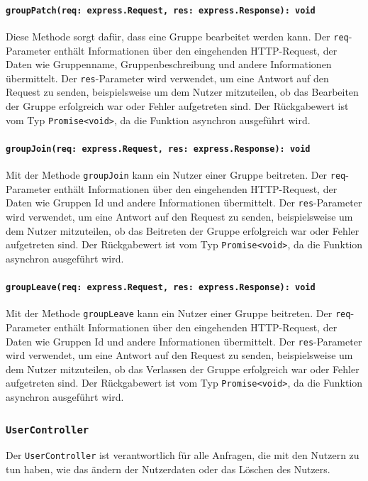 \documentclass{entwurfsheft}
\begin{document}
\paragraph{\texttt{groupPatch(req: express.Request, res: express.Response): void}}
Diese Methode sorgt dafür, dass eine Gruppe bearbeitet werden kann. Der \texttt{req}-Parameter enthält Informationen über den eingehenden HTTP-Request, der Daten wie Gruppenname, Gruppenbeschreibung und andere Informationen übermittelt. Der \texttt{res}-Parameter wird verwendet, um eine Antwort auf den Request zu senden, beispielsweise um dem Nutzer mitzuteilen, ob das Bearbeiten der Gruppe erfolgreich war oder Fehler aufgetreten sind.
Der Rückgabewert ist vom Typ \texttt{Promise<void>}, da die Funktion asynchron ausgeführt wird.
\paragraph{\texttt{groupJoin(req: express.Request, res: express.Response): void}}
Mit der Methode \texttt{groupJoin} kann ein Nutzer einer Gruppe beitreten. Der \texttt{req}-Parameter enthält Informationen über den eingehenden HTTP-Request, der Daten wie Gruppen Id und andere Informationen übermittelt. Der \texttt{res}-Parameter wird verwendet, um eine Antwort auf den Request zu senden, beispielsweise um dem Nutzer mitzuteilen, ob das Beitreten der Gruppe erfolgreich war oder Fehler aufgetreten sind.
Der Rückgabewert ist vom Typ \texttt{Promise<void>}, da die Funktion asynchron ausgeführt wird.
\paragraph{\texttt{groupLeave(req: express.Request, res: express.Response): void}}
Mit der Methode \texttt{groupLeave} kann ein Nutzer einer Gruppe beitreten. Der \texttt{req}-Parameter enthält Informationen über den eingehenden HTTP-Request, der Daten wie Gruppen Id und andere Informationen übermittelt. Der \texttt{res}-Parameter wird verwendet, um eine Antwort auf den Request zu senden, beispielsweise um dem Nutzer mitzuteilen, ob das Verlassen der Gruppe erfolgreich war oder Fehler aufgetreten sind.
Der Rückgabewert ist vom Typ \texttt{Promise<void>}, da die Funktion asynchron ausgeführt wird.

\subsubsection{\texttt{UserController}}\label{sec:UserController}
Der \texttt{UserController} ist verantwortlich für alle Anfragen, die mit den Nutzern zu tun haben, wie das ändern der Nutzerdaten oder das Löschen des Nutzers.
\end{document}
